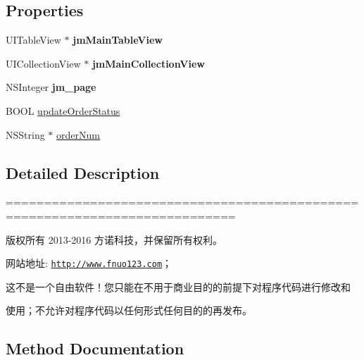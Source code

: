 \subsection*{Properties}
\begin{DoxyCompactItemize}
\item 
\mbox{\label{interface_a_d_super_view_controller_a769540426d596205cd934f4288eaadeb}} 
U\+I\+Table\+View $\ast$ {\bfseries jm\+Main\+Table\+View}
\item 
\mbox{\label{interface_a_d_super_view_controller_a65511205950354614f6cf6ee18ed203c}} 
U\+I\+Collection\+View $\ast$ {\bfseries jm\+Main\+Collection\+View}
\item 
\mbox{\label{interface_a_d_super_view_controller_aaf3ab0068dd76b11d623cf55dac49987}} 
N\+S\+Integer {\bfseries jm\+\_\+page}
\item 
B\+O\+OL \mbox{\hyperlink{interface_a_d_super_view_controller_a8c7ad181e8405cfac84a53ae5c44d987}{update\+Order\+Status}}
\item 
N\+S\+String $\ast$ \mbox{\hyperlink{interface_a_d_super_view_controller_ab8010fdd29cdca9d38c2677be2496679}{order\+Num}}
\end{DoxyCompactItemize}


\subsection{Detailed Description}
============================================================================

版权所有 2013-\/2016 方诺科技，并保留所有权利。

网站地址\+: \href{http://www.fnuo123.com}{\tt http\+://www.\+fnuo123.\+com}； 



这不是一个自由软件！您只能在不用于商业目的的前提下对程序代码进行修改和

使用；不允许对程序代码以任何形式任何目的的再发布。 

 

\subsection{Method Documentation}
\mbox{\label{interface_a_d_super_view_controller_aa68e297b4c4dc76a063dd558592598f3}} 
